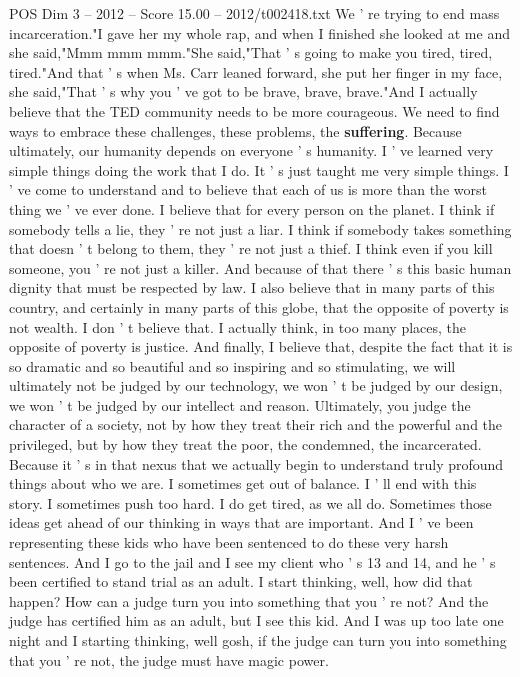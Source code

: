 \begin{textsample}{POS Dim 3 – 2012 – Score 15.00 – 2012/t002418.txt}
We ' re trying to end mass incarceration."I gave her my whole rap, and when I finished she looked at me and she said,"Mmm mmm mmm."She said,"That ' s going to make you tired, tired, tired."And that ' s when Ms.
Carr leaned forward, she put her finger in my face, she said,"That ' s why you ' ve got to be brave, brave, brave."And I actually believe that the TED community needs to be more courageous.
We need to find ways to embrace these challenges, these problems, the \textbf{suffering}.
Because ultimately, our humanity depends on everyone ' s humanity.
I ' ve learned very simple things doing the work that I do.
It ' s just taught me very simple things.
I ' ve come to understand and to believe that each of us is more than the worst thing we ' ve ever done.
I believe that for every person on the planet.
I think if somebody tells a lie, they ' re not just a liar.
I think if somebody takes something that doesn ' t belong to them, they ' re not just a thief.
I think even if you kill someone, you ' re not just a killer.
And because of that there ' s this basic human dignity that must be respected by law.
I also believe that in many parts of this country, and certainly in many parts of this globe, that the opposite of poverty is not wealth.
I don ' t believe that.
I actually think, in too many places, the opposite of poverty is justice.
And finally, I believe that, despite the fact that it is so dramatic and so beautiful and so inspiring and so stimulating, we will ultimately not be judged by our technology, we won ' t be judged by our design, we won ' t be judged by our intellect and reason.
Ultimately, you judge the character of a society, not by how they treat their rich and the powerful and the privileged, but by how they treat the poor, the condemned, the incarcerated.
Because it ' s in that nexus that we actually begin to understand truly profound things about who we are.
I sometimes get out of balance.
I ' ll end with this story.
I sometimes push too hard.
I do get tired, as we all do.
Sometimes those ideas get ahead of our thinking in ways that are important.
And I ' ve been representing these kids who have been sentenced to do these very harsh sentences.
And I go to the jail and I see my client who ' s 13 and 14, and he ' s been certified to stand trial as an adult.
I start thinking, well, how did that happen?
How can a judge turn you into something that you ' re not?
And the judge has certified him as an adult, but I see this kid.
And I was up too late one night and I starting thinking, well gosh, if the judge can turn you into something that you ' re not, the judge must have magic power.

\end{textsample}
